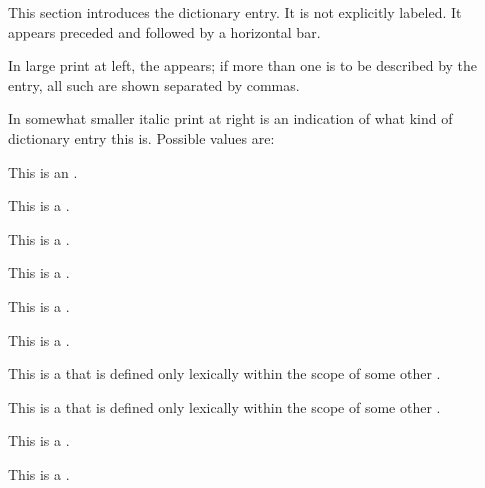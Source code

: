 \endsubsubsection%


This section introduces the dictionary entry.  It is not explicitly labeled.
It appears preceded and followed by a horizontal bar.

In large print at left, the  appears; if more than one
 is to be described by the entry, all such  
are shown separated by commas.

In somewhat smaller italic print at right is an indication of what kind
of dictionary entry this is.  Possible values are:

\beginlist


This is an  .


This is a .


This is a .


This is a .


This is a .


This is a .


This is a  that is defined only lexically within the scope of some
other .


This is a  that is defined only lexically within the scope of some
other .


This is a .


This is a .

